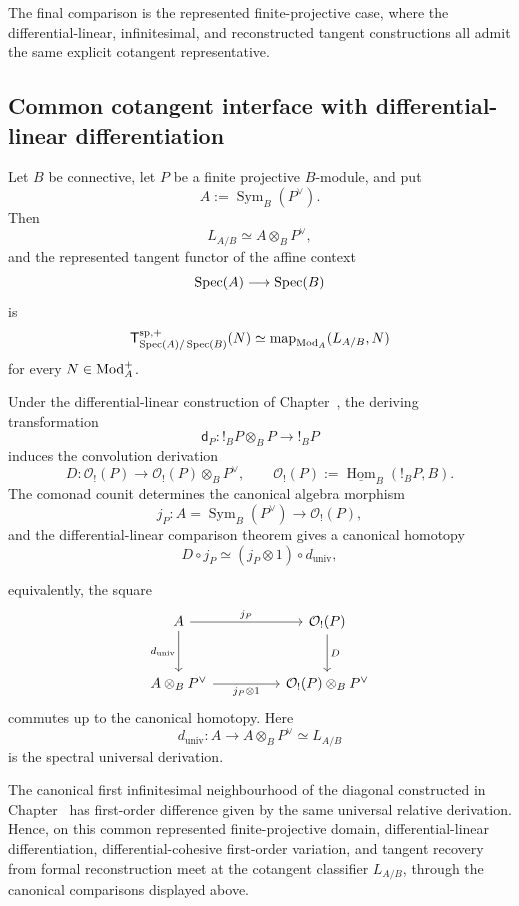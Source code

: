 The final comparison is the represented finite-projective case, where the
differential-linear, infinitesimal, and reconstructed tangent constructions all admit
the same explicit cotangent representative.

\subsection{Common cotangent interface with differential-linear differentiation}

\begin{corollary}
\label{cor:seely-formal-reconstruction-cotangent-interface}
Let \(B\) be connective, let \(P\) be a finite projective \(B\)-module, and put
\[
    A:=\operatorname{Sym}_B(P^\vee).
\]
Then
\[
    L_{A/B}\simeq A\otimes_BP^\vee,
\]
and the represented tangent functor of the affine context
\[
    \operatorname{Spec}(A)\longrightarrow\operatorname{Spec}(B)
\]
is
\[
    \mathsf T^{\mathrm{sp},+}_{\operatorname{Spec}(A)/\operatorname{Spec}(B)}(N)
    \simeq
    \operatorname{map}_{\operatorname{Mod}_A}(L_{A/B},N)
\]
for every \(N\in\operatorname{Mod}_A^+\).

Under the differential-linear construction of
Chapter~, the deriving
transformation
\[
    \mathsf d_P:
    !_BP\otimes_BP
    \longrightarrow
    !_BP
\]
induces the convolution derivation
\[
    D:
    \mathcal O_!(P)
    \longrightarrow
    \mathcal O_!(P)\otimes_BP^\vee,
    \qquad
    \mathcal O_!(P)
    :=
    \underline{\operatorname{Hom}}_B(!_BP,B).
\]
The comonad counit determines the canonical algebra morphism
\[
    j_P:
    A=\operatorname{Sym}_B(P^\vee)
    \longrightarrow
    \mathcal O_!(P),
\]
and the differential-linear comparison theorem gives a canonical homotopy
\[
    D\circ j_P
    \simeq
    (j_P\otimes1)\circ d_{\mathrm{univ}},
\]

equivalently, the square
\[
\begin{tikzcd}[column sep=huge,row sep=large]
    A \arrow[r,"j_P"] \arrow[d,"d_{\mathrm{univ}}"']
        & \mathcal O_!(P) \arrow[d,"D"]
    \\
    A\otimes_BP^\vee
        \arrow[r,"j_P\otimes1"']
        & \mathcal O_!(P)\otimes_BP^\vee
\end{tikzcd}
\]
commutes up to the canonical homotopy. Here
\[
    d_{\mathrm{univ}}:
    A\longrightarrow A\otimes_BP^\vee
    \simeq L_{A/B}
\]
is the spectral universal derivation.

The canonical first infinitesimal neighbourhood of the diagonal constructed in
Chapter~ has first-order
difference given by the same universal relative derivation. Hence, on this
common represented finite-projective domain, differential-linear
differentiation, differential-cohesive first-order variation, and tangent
recovery from formal reconstruction meet at the cotangent classifier
\(L_{A/B}\), through the canonical comparisons displayed above.
\end{corollary}

